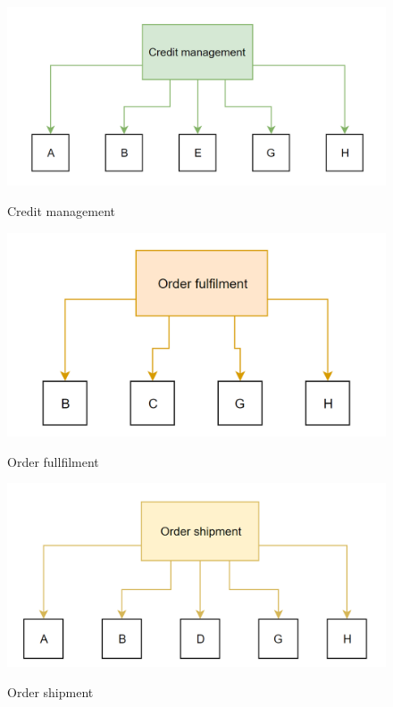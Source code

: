 \documentclass[aspectratio=169]{beamer}
\begin{document}
\begin{frame}
\begin{figure}
	\caption{Credit management}
	\includegraphics[height=.8\textheight]{img/creditmanagement.png}
	\label{img:credit_management}
\end{figure}
\end{frame}

\begin{frame}
\begin{figure}
	\caption{Order fullfilment}
	\includegraphics[height=.8\textheight]{img/orderfullfilment.png}
	\label{img:order_fullfilment}
\end{figure}
\end{frame}

\begin{frame}
\begin{figure}
	\caption{Order shipment}
	\includegraphics[height=.8\textheight]{img/ordershipment.png}
	\label{img:order_shipment}
\end{figure}
\end{frame}
\end{document}
